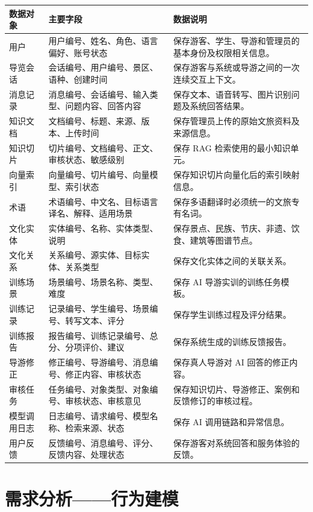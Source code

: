 \begin{longtable}{p{2.6cm}p{4.2cm}p{6.4cm}}
\toprule
数据对象 & 主要字段 & 数据说明 \\
\midrule
用户 & 用户编号、姓名、角色、语言偏好、账号状态 & 保存游客、学生、导游和管理员的基本身份及权限相关信息。 \\
导览会话 & 会话编号、用户编号、景区、语种、创建时间 & 保存游客与系统或导游之间的一次连续交互上下文。 \\
消息记录 & 消息编号、会话编号、输入类型、问题内容、回答内容 & 保存文本、语音转写、图片识别问题及系统回答结果。 \\
知识文档 & 文档编号、标题、来源、版本、上传时间 & 保存管理员上传的原始文旅资料及来源信息。 \\
知识切片 & 切片编号、文档编号、正文、审核状态、敏感级别 & 保存 RAG 检索使用的最小知识单元。 \\
向量索引 & 向量编号、切片编号、向量模型、索引状态 & 保存知识切片向量化后的索引映射信息。 \\
术语 & 术语编号、中文名、目标语言译名、解释、适用场景 & 保存多语翻译时必须统一的文旅专有名词。 \\
文化实体 & 实体编号、名称、实体类型、说明 & 保存景点、民族、节庆、非遗、饮食、建筑等图谱节点。 \\
文化关系 & 关系编号、源实体、目标实体、关系类型 & 保存文化实体之间的关联关系。 \\
训练场景 & 场景编号、场景名称、类型、难度 & 保存 AI 导游实训的训练任务模板。 \\
训练记录 & 记录编号、学生编号、场景编号、转写文本、评分 & 保存学生训练过程及评分结果。 \\
训练报告 & 报告编号、训练记录编号、总分、分项评价、建议 & 保存系统生成的训练反馈报告。 \\
导游修正 & 修正编号、导游编号、消息编号、修正内容、审核状态 & 保存真人导游对 AI 回答的修正内容。 \\
审核任务 & 任务编号、对象类型、对象编号、审核状态、审核意见 & 保存知识切片、导游修正、案例和反馈修订的审核过程。 \\
模型调用日志 & 日志编号、请求编号、模型名称、检索来源、状态 & 保存 AI 调用链路和异常信息。 \\
用户反馈 & 反馈编号、消息编号、评分、反馈内容、处理状态 & 保存游客对系统回答和服务体验的反馈。 \\
\bottomrule
\end{longtable}

\section{需求分析——行为建模}

